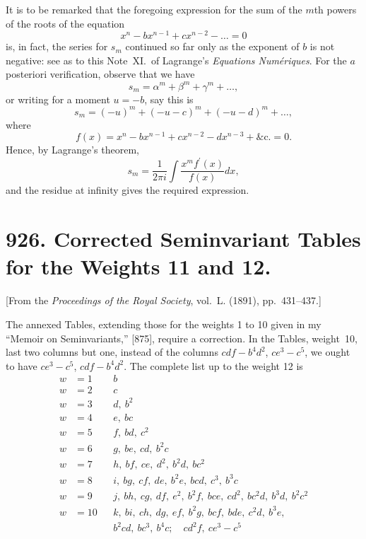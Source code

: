 \documentclass[11pt,a4paper]{book}
\begin{document}
{{{It is to be remarked that the foregoing expression for the sum of the $m$th
powers of the roots of the equation
\[
x^n - bx^{n-1} + cx^{n-2} - \ldots = 0
\]
is, in fact, the series for $s_m$ continued so far only as the exponent of $b$ is not
negative: see as to this Note~XI.~of Lagrange's \textit{Equations Num\'eriques}. For the $a$
posteriori verification, observe that we have
\[
s_m = \alpha^m + \beta^m + \gamma^m + \ldots,
\]
or writing for a moment $u = -b$, say this is
\[
s_m = (-u)^m + (-u - c)^m + (-u - d)^m + \ldots,
\]
where
\[
f(x) = x^n - bx^{n-1} + cx^{n-2} - dx^{n-3} + \&\text{c.} = 0.
\]
Hence, by Lagrange's theorem,
\[
s_m = \frac{1}{2\pi i} \int \frac{x^m f^\prime(x)}{f(x)} dx,
\]
and the residue at infinity gives the required expression.



\newpage
\section*{926. Corrected Seminvariant Tables for the Weights 11 and 12.}

[From the \textit{Proceedings of the Royal Society}, vol.~L. (1891), pp.~431--437.]

\bigskip

The annexed Tables, extending those for the weights 1 to 10 given in my
``Memoir on Seminvariants,'' [875], require a correction. In the Tables, weight~10,
last two columns but one, instead of the columns $cdf - b^4d^2$, $ce^3 - c^5$, we ought to have
$ce^3 - c^5$, $cdf - b^4d^2$. The complete list up to the weight 12 is
\begin{align*}
w &= 1 && b\\
w &= 2 && c\\
w &= 3 && d,\ b^2\\
w &= 4 && e,\ bc\\
w &= 5 && f,\ bd,\ c^2\\
w &= 6 && g,\ be,\ cd,\ b^2c\\
w &= 7 && h,\ bf,\ ce,\ d^2,\ b^2d,\ bc^2\\
w &= 8 && i,\ bg,\ cf,\ de,\ b^2e,\ bcd,\ c^3,\ b^3c\\
w &= 9 && j,\ bh,\ cg,\ df,\ e^2,\ b^2f,\ bce,\ cd^2,\ bc^2d,\ b^3d,\ b^2c^2\\
w &= 10 && k,\ bi,\ ch,\ dg,\ ef,\ b^2g,\ bcf,\ bde,\ c^2d,\ b^3e,\\
&&& b^2cd,\ bc^3,\ b^4c;\quad cd^2f,\ ce^3 - c^5
\end{align*}

}}}
\end{document}
